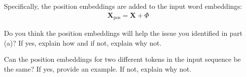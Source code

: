 \begin{parts}
    Specifically, the position embeddings are added to the input word embeddings:
    \begin{align*}
        \mathbf{X}_{\text{pos}} = \mathbf{X} + \Phi
    \end{align*}

    \begin{subparts}
        \subpart[1] Do you think the position embeddings will help the issue you identified in part (a)? If yes, explain how and if not, explain why not.
        \inlineanswer{\positionEmbeddingHelps}

        \subpart[1] Can the position embeddings for two different tokens in the input sequence be the same? If yes, provide an example. If not, explain why not.
        \inlineanswer{\positionEmbeddingUnique}

    \end{subparts}
\end{parts}
